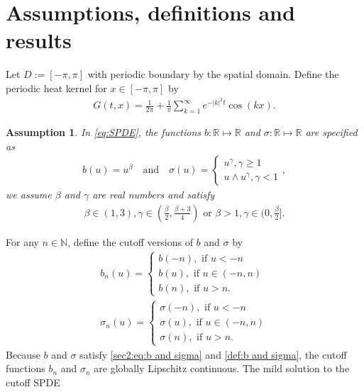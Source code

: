 \documentclass[12pt]{article}
\newtheorem{assumption}{Assumption}
\numberwithin{equation}{section}
\begin{document}
\section{Assumptions, definitions and results}\label{S:setup}
Let $D:=[-\pi,\pi]$ with periodic boundary by the spatial domain. Define the periodic heat kernel for $x\in [-\pi,\pi]$ by
\begin{align}
    G(t,x)=\frac{1}{2\pi}+\frac{1}{\pi}\sum_{k=1}^\infty e^{-|k|^2t}\cos(kx).\label{eq:heat kernel}
\end{align}
\begin{assumption}\label{assumption1}
In \eqref{eq:SPDE}, the functions $b:\mathbb{R}\mapsto\mathbb{R}$ and $\sigma:\mathbb{R}\mapsto\mathbb{R}$ are specified as
\begin{align}
    b(u)=u^{\beta}\quad\text{and}\quad \sigma(u)=\begin{cases}
        u^{\gamma},\gamma\geq 1\\
        u\wedge u^{\gamma},\gamma<1
    \end{cases}, \label{sec2:eq:b and sigma}
\end{align}
we assume $\beta$ and $\gamma$ are real numbers and satisfy
\begin{align}
    \beta\in (1,3),\gamma\in \left(\frac{\beta}{2},\frac{\beta+3}{4}\right)\text{ or } \beta>1,\gamma\in (0,\frac{\beta}{2}].\label{def:b and sigma}
\end{align}
\end{assumption}
For any $n\in\mathbb{N}$, define the cutoff versions of $b$ and $\sigma$ by
\begin{align}
    b_n(u)=\begin{cases}
        b(-n),\text{ if }u<-n\\
        b(u),\text{ if }u\in(-n,n)\\
        b(n),\text{ if }u>n.
    \end{cases}\label{eq:cutoff of b}\\
    \sigma_n(u)=\begin{cases}
        \sigma(-n),\text{ if }u<-n\\
        \sigma(u),\text{ if }u\in(-n,n)\\
        \sigma(n),\text{ if }u>n.
    \end{cases}\label{eq:cutoff of sigma}
\end{align}
Because $b$ and $\sigma$ satisfy \eqref{sec2:eq:b and sigma} and \eqref{def:b and sigma}, the cutoff functions $b_n$ and $\sigma_n$ are globally Lipschitz continuous. The mild solution to the cutoff SPDE
\end{document}
